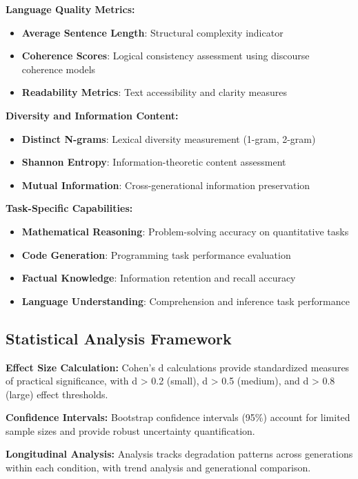 \documentclass[11pt]{article}
\begin{document}
\textbf{Language Quality Metrics:}
\begin{itemize}
    \item \textbf{Average Sentence Length}: Structural complexity indicator
    \item \textbf{Coherence Scores}: Logical consistency assessment using discourse coherence models
    \item \textbf{Readability Metrics}: Text accessibility and clarity measures
\end{itemize}

\textbf{Diversity and Information Content:}
\begin{itemize}
    \item \textbf{Distinct N-grams}: Lexical diversity measurement (1-gram, 2-gram)
    \item \textbf{Shannon Entropy}: Information-theoretic content assessment
    \item \textbf{Mutual Information}: Cross-generational information preservation
\end{itemize}

\textbf{Task-Specific Capabilities:}
\begin{itemize}
    \item \textbf{Mathematical Reasoning}: Problem-solving accuracy on quantitative tasks
    \item \textbf{Code Generation}: Programming task performance evaluation
    \item \textbf{Factual Knowledge}: Information retention and recall accuracy
    \item \textbf{Language Understanding}: Comprehension and inference task performance
\end{itemize}

\subsection{Statistical Analysis Framework}

\textbf{Effect Size Calculation:} Cohen's d calculations provide standardized measures of practical significance, with d > 0.2 (small), d > 0.5 (medium), and d > 0.8 (large) effect thresholds.

\textbf{Confidence Intervals:} Bootstrap confidence intervals (95\%) account for limited sample sizes and provide robust uncertainty quantification.

\textbf{Longitudinal Analysis:} Analysis tracks degradation patterns across generations within each condition, with trend analysis and generational comparison.
\end{document}
